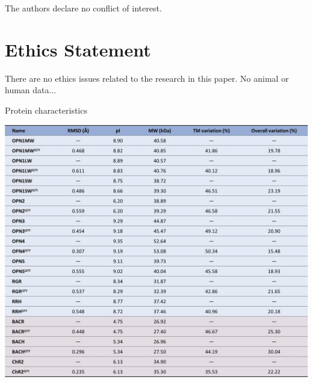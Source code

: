 \documentclass[fleqn,10pt,lineno]{manuscript}
\begin{document}
The authors declare no conflict of interest.


\section*{Ethics Statement}

There are no ethics issues related to the research in this paper. No animal or human data...




\begin{table}[htbp]
	\centering
	\caption{Protein characteristics}
	\label{tb:characteristics}
	\includegraphics[width=\linewidth]{Figures/characteristics.jpg}
\end{table}
\end{document}
